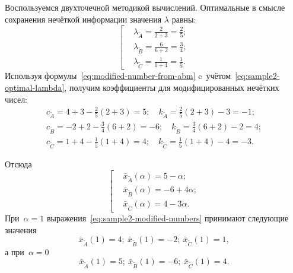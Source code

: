 Воспользуемся двухточечной методикой вычислений. Оптимальные в смысле сохранения нечёткой информации значения $\lambda$ равны:
\begin{equation}
\label{eq:sample2-optimal-lambda}
  \left[ \begin{aligned}
    & \lambda_{\tilde A}=\frac{2}{2+3}=\frac{2}{5}; \\ 
    & \lambda_{\tilde B}=\frac{6}{6+2}=\frac{3}{4}; \\ 
    & \lambda_{\tilde C}=\frac{1}{1+4}=\frac{1}{5}.
  \end{aligned} \right.
\end{equation}
Используя формулы~\eqref{eq:modified-number-from-abm} c~учётом~\eqref{eq:sample2-optimal-lambda}, получим коэффициенты для модифицированных нечётких чисел:
\begin{gather*}
  c_{\tilde A}=4+3-\frac{2}{5}\left( 2+3 \right)=5;\quad k_{\tilde A}=\frac{2}{5}\left( 2+3 \right)-3=-1; \\ 
  c_{\tilde B}=-2+2-\frac{3}{4}\left( 6+2 \right)=-6;\quad k_{\tilde B}=\frac{3}{4}\left( 6+2 \right)-2=4; \\ 
  c_{\tilde C}=1+4-\frac{1}{5}\left( 1+4 \right)=4;\quad k_{\tilde C}=\frac{1}{5}\left( 1+4 \right)-4=-3.
\end{gather*}

Отсюда
\begin{equation}
\label{eq:sample2-modified-numbers}
  \left[ \begin{aligned}
    & \bar{x}_{\tilde A}\left( \alpha  \right)=5-\alpha;  \\ 
    & \bar{x}_{\tilde B}\left( \alpha  \right)=-6+4\alpha;  \\ 
    & \bar{x}_{\tilde C}\left( \alpha  \right)=4-3\alpha.
  \end{aligned} \right.
\end{equation}
При~$\alpha=1$ выражения~\eqref{eq:sample2-modified-numbers} принимают следующие значения
\begin{equation*}
  \bar{x}_{\tilde A}\left( 1 \right)=4;\ \bar{x}_{\tilde B}\left( 1 \right)=-2;\ \bar{x}_{\tilde C}\left( 1 \right)=1,
\end{equation*}
а при~$\alpha=0$
\begin{equation*}
  \bar{x}_{\tilde A}\left( 1 \right)=5;\ \bar{x}_{\tilde B}\left( 1 \right)=-6;\ \bar{x}_{\tilde C}\left( 1 \right)=4.
\end{equation*}

